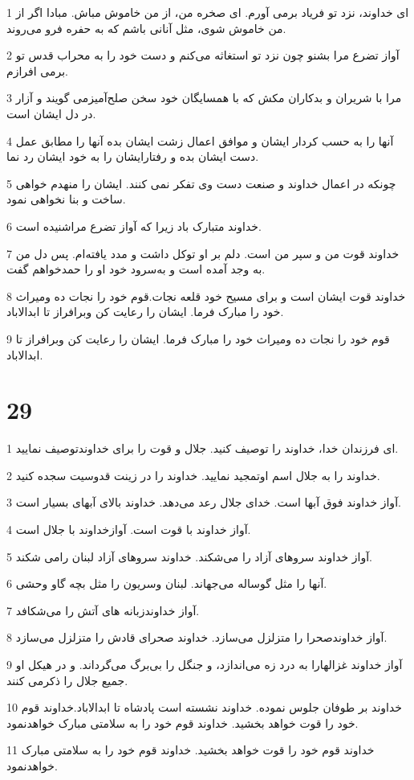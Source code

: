 \par 1 ای خداوند، نزد تو فریاد برمی آورم. ای صخره من، از من خاموش مباش. مبادا اگر از من خاموش شوی، مثل آنانی باشم که به حفره فرو می‌روند.
\par 2 آواز تضرع مرا بشنو چون نزد تو استغاثه می‌کنم و دست خود را به محراب قدس تو برمی افرازم.
\par 3 مرا با شریران و بدکاران مکش که با همسایگان خود سخن صلح‌آمیزمی گویند و آزار در دل ایشان است.
\par 4 آنها را به حسب کردار ایشان و موافق اعمال زشت ایشان بده آنها را مطابق عمل دست ایشان بده و رفتارایشان را به خود ایشان رد نما.
\par 5 چونکه در اعمال خداوند و صنعت دست وی تفکر نمی کنند. ایشان را منهدم خواهی ساخت و بنا نخواهی نمود.
\par 6 خداوند متبارک باد زیرا که آواز تضرع مراشنیده است.
\par 7 خداوند قوت من و سپر من است. دلم بر او توکل داشت و مدد یافته‌ام. پس دل من به وجد آمده است و به‌سرود خود او را حمدخواهم گفت.
\par 8 خداوند قوت ایشان است و برای مسیح خود قلعه نجات.قوم خود را نجات ده ومیراث خود را مبارک فرما. ایشان را رعایت کن وبرافراز تا ابدالاباد.
\par 9 قوم خود را نجات ده ومیراث خود را مبارک فرما. ایشان را رعایت کن وبرافراز تا ابدالاباد.
 
\chapter{29}

\par 1 ای فرزندان خدا، خداوند را توصیف کنید. جلال و قوت را برای خداوندتوصیف نمایید.
\par 2 خداوند را به جلال اسم اوتمجید نمایید. خداوند را در زینت قدوسیت سجده کنید.
\par 3 آواز خداوند فوق آبها است. خدای جلال رعد می‌دهد. خداوند بالای آبهای بسیار است.
\par 4 آواز خداوند با قوت است. آوازخداوند با جلال است.
\par 5 آواز خداوند سروهای آزاد را می‌شکند. خداوند سروهای آزاد لبنان رامی شکند.
\par 6 آنها را مثل گوساله می‌جهاند. لبنان وسریون را مثل بچه گاو وحشی.
\par 7 آواز خداوندزبانه های آتش را می‌شکافد.
\par 8 آواز خداوندصحرا را متزلزل می‌سازد. خداوند صحرای قادش را متزلزل می‌سازد.
\par 9 آواز خداوند غزالهارا به درد زه می‌اندازد، و جنگل را بی‌برگ می‌گرداند. و در هیکل او جمیع جلال را ذکرمی کنند.
\par 10 خداوند بر طوفان جلوس نموده. خداوند نشسته است پادشاه تا ابدالاباد.خداوند قوم خود را قوت خواهد بخشید. خداوند قوم خود را به سلامتی مبارک خواهدنمود.
\par 11 خداوند قوم خود را قوت خواهد بخشید. خداوند قوم خود را به سلامتی مبارک خواهدنمود.
 

